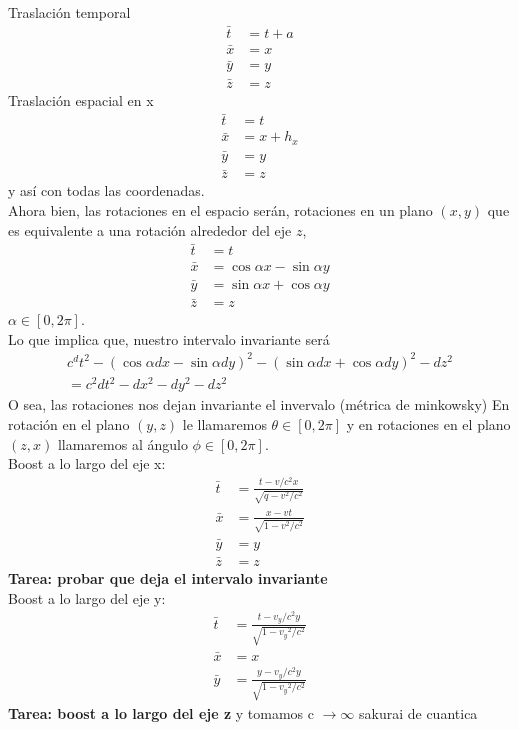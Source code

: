 \documentclass[../main.tex]{subfiles}
\begin{document}
Traslación temporal
\begin{align*}
    \bar{t} & = t + a \\
    \bar{x} &= x\\ \bar{y} &=y\\ \bar{z} &=z
\end{align*}
Traslación espacial en x
\begin{align*}
    \bar{t} & = t \\
    \bar{x} &= x +h_x\\ \bar{y} &=y\\ \bar{z} &=z
\end{align*}
y así con todas las coordenadas. \\
Ahora bien, las rotaciones en el espacio serán, rotaciones en un plano $(x,y)$ que es equivalente a una rotación alrededor del eje $z$, 
\begin{align*}
    \bar{t} & =t \\
    \bar{x} & = \cos{\alpha}x - \sin{\alpha}y \\
    \bar{y} & = \sin{\alpha}x + \cos{\alpha}y \\
    \bar{z} & =z
\end{align*}
$\alpha \in [0,2\pi]$. \\
Lo que implica  que, nuestro intervalo invariante será
\begin{align*}
    c^dt^2-(\cos{\alpha}dx-\sin{\alpha}dy)^2-(\sin{\alpha}dx + \cos{\alpha}dy)^2 - dz^2 \\
    = c^2dt^2 - dx^2 - dy^2-dz^2
\end{align*}
O sea, las rotaciones nos dejan invariante el invervalo (métrica de minkowsky)
En rotación en el plano $(y,z)$ le llamaremos $\theta \in [0,2\pi]$ y en rotaciones en el plano $(z,x)$ llamaremos al ángulo $\phi\in[0,2\pi]$. \\
Boost a lo largo del eje x:
\begin{align*}
    \bar{t} & = \frac{t-v/c^2x}{\sqrt{q-v^2/c^2}} \\
    \bar{x} & = \frac{x-vt}{\sqrt{1-v^2/c^2}} \\
    \bar{y} & = y \\
    \bar{z} & = z
\end{align*}
\textbf{Tarea: probar que deja el intervalo invariante} \\
Boost a lo largo del eje y:
\begin{align*}
    \bar{t} &  = \frac{t-v_y/c^2 y}{\sqrt{1-{v_y}^2/c^2}} \\
    \bar{x} & = x \\
    \bar{y} & = \frac{y-v_y/c^2 y }{\sqrt{1-{v_y}^2/c^2}}
\end{align*}
\textbf{Tarea: boost a lo largo del eje z} y tomamos c $\to \infty$ sakurai de cuantica
\end{document}
